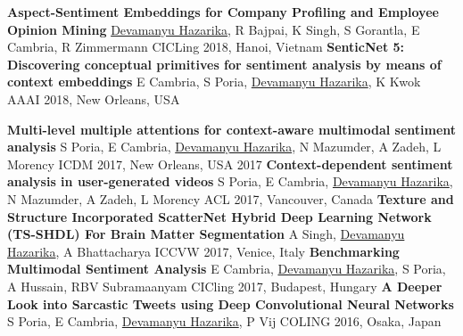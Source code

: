 \begin{cvpublications}
  \cvpublication
    {\textbf{Aspect-Sentiment Embeddings for Company Profiling and Employee Opinion Mining}} %
    {\underline{Devamanyu Hazarika}, R Bajpai, K Singh, S Gorantla, E Cambria, R Zimmermann} %
    {CICLing 2018, Hanoi, Vietnam} %
    {} %
  \cvpublication
    {\textbf{SenticNet 5: Discovering conceptual primitives for sentiment analysis by means of context embeddings}} %
    {E Cambria, S Poria, \underline{Devamanyu Hazarika}, K Kwok} %
    {AAAI 2018, New Orleans, USA} %
    {} %

\begin{cvpublications}
  \cvpublication
    {\textbf{Multi-level multiple attentions for context-aware multimodal sentiment analysis}} %
    {S Poria, E Cambria, \underline{Devamanyu Hazarika}, N Mazumder, A Zadeh, L Morency} %
    {ICDM 2017, New Orleans, USA} %
    {2017} %
  \cvpublication
    {\textbf{Context-dependent sentiment analysis in user-generated videos}} %
    {S Poria, E Cambria, \underline{Devamanyu Hazarika}, N Mazumder, A Zadeh, L Morency} %
    {ACL 2017, Vancouver, Canada} %
    {} %
  \cvpublication
    {\textbf{Texture and Structure Incorporated ScatterNet Hybrid Deep Learning Network (TS-SHDL) For Brain Matter Segmentation}} %
    {A Singh, \underline{Devamanyu Hazarika}, A Bhattacharya} %
    {ICCVW 2017, Venice, Italy} %
    {} %
  \cvpublication
    {\textbf{Benchmarking Multimodal Sentiment Analysis}} %
    {E Cambria, \underline{Devamanyu Hazarika}, S Poria, A Hussain, RBV Subramaanyam} %
    {CICling 2017, Budapest, Hungary} %
    {} %
  \cvpublication
    {\textbf{A Deeper Look into Sarcastic Tweets using Deep Convolutional Neural Networks}} %
    {S Poria, E Cambria, \underline{Devamanyu Hazarika}, P Vij} %
    {COLING 2016, Osaka, Japan} %
    {} %
    
\end{cvpublications}   
\end{cvpublications}



